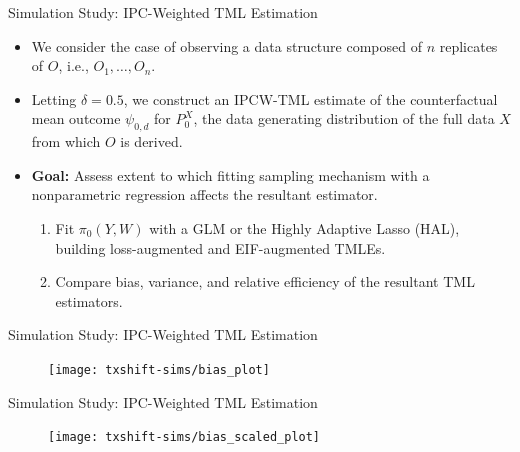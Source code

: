 \documentclass{beamer}
\begin{document}

\begin{frame}[c]{Simulation Study: IPC-Weighted TML Estimation}

\begin{center}
\begin{itemize}
  \itemsep10pt
   \item We consider the case of observing a data structure composed of $n$
     replicates of $O$, i.e., $O_1, \ldots, O_n$.
   \item Letting $\delta = 0.5$, we construct an IPCW-TML estimate of the
     counterfactual mean outcome $\psi_{0, d}$ for $P_0^X$, the data generating
     distribution of the full data $X$ from which $O$ is derived.
    \item \textbf{Goal:} Assess extent to which fitting sampling mechanism with
      a nonparametric regression affects the resultant estimator.
      \begin{enumerate}
        \itemsep2pt
        \item Fit $\pi_0(Y,W)$ with a GLM or the Highly Adaptive Lasso (HAL),
          building loss-augmented and EIF-augmented TMLEs.
        \item Compare bias, variance, and relative efficiency of the resultant
          TML estimators.
      \end{enumerate}
\end{itemize}
\end{center}

\note{
}

\end{frame}


\begin{frame}[c]{Simulation Study: IPC-Weighted TML Estimation}

\vspace{-0.45em}
\begin{figure}\label{fig:txshift-bias}
  \centering
  \texttt{[image: txshift-sims/bias\_plot]}
\end{figure}

\note{
}

\end{frame}


\begin{frame}[c]{Simulation Study: IPC-Weighted TML Estimation}

\vspace{-0.45em}
\begin{figure}\label{fig:txshift-rootnbias}
  \centering
  \texttt{[image: txshift-sims/bias\_scaled\_plot]}
\end{figure}

\note{
}

\end{frame}
\end{document}
